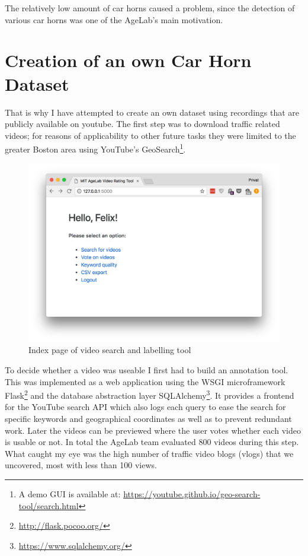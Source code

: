 The relatively low amount of car horns caused a problem, since the detection of various car horns was one of the AgeLab's main motivation. 


\section{Creation of an own Car Horn Dataset}

That is why I have attempted to create an own dataset using recordings that are publicly available on youtube. The first step was to download traffic related videos; for reasons of applicability to other future tasks they were limited to the greater Boston area using YouTube's GeoSearch\footnote{A demo GUI is available at: \url{https://youtube.github.io/geo-search-tool/search.html}}.

\begin{figure}
    \centering
	\includegraphics[width=.6\textwidth]{./images/illustrations/label}
    \caption{Index page of video search and labelling tool}
	\label{fig:label}
\end{figure}


To decide whether a video was useable I first had to build an annotation tool. This was implemented as a web application using the WSGI microframework Flask\footnote{\url{http://flask.pocoo.org/}} and the database abstraction layer SQLAlchemy\footnote{\url{https://www.sqlalchemy.org/}}. It provides a frontend for the YouTube search API which also logs each query to ease the search for specific keywords and geographical coordinates as well as to prevent redundant work. Later the videos can be previewed where the user votes whether each video is usable or not. In total the AgeLab team evaluated 800 videos during this step. What caught my eye was the high number of traffic video blogs (vlogs) that we uncovered, most with less than 100 views. 

